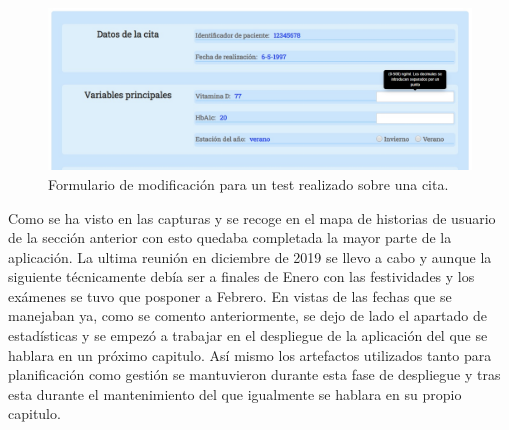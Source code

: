 \begin{figure}[h]
    \centering
     \includegraphics[width=1\textwidth]{images/modificarCita.jpg}
    \caption{Formulario de modificación para un test realizado sobre una cita.}
\end{figure}

Como se ha visto en las capturas y se recoge en el mapa de historias de usuario de la sección anterior con esto quedaba completada la mayor parte de la aplicación. La ultima reunión en diciembre de 2019 se llevo a cabo y aunque la siguiente técnicamente debía ser a finales de Enero con las festividades y los exámenes se tuvo que posponer a Febrero. En vistas de las fechas que se manejaban ya, como se comento anteriormente, se dejo de lado el apartado de estadísticas y se empezó a trabajar en el despliegue de la aplicación del que se hablara en un próximo capitulo. Así mismo los artefactos utilizados tanto para planificación como gestión se mantuvieron durante esta fase de despliegue y tras esta durante el mantenimiento del que igualmente se hablara en su propio capitulo.